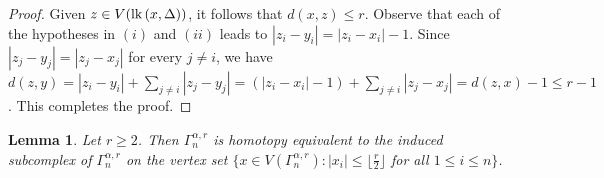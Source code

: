 \documentclass{amsart}
\newtheorem{lemma}[theorem]{Lemma}
\theoremstyle{definition}
\theoremstyle{remark}
\numberwithin{equation}{section}
\newcommand{\lk}{\mbox{\upshape lk}\,}
\newcommand{\D}{\Delta}
\newcommand{\f}{\lfloor\frac{r}{2}\rfloor}
\begin{document}
\begin{proof}
	Given $z\in V(\lk(x,\D))$, it follows that $d(x,z)\leq r$. Observe that each of the hypotheses in $(i)$ and $(ii)$ leads to $|z_i - y_i| = |z_i - x_i| - 1$. Since $|z_j - y_j| = |z_j - x_j|$ for every $j \neq i$, we have  $
	d(z, y) = |z_i - y_i| + \sum_{j \neq i} |z_j - y_j| = (|z_i - x_i| - 1) + \sum_{j \neq i} |z_j - x_j| = d(z, x) - 1 \leq r - 1$. This completes the proof.
\end{proof}


\begin{lemma}\label{r/2}
	Let $r\geq 2$. Then $\Gamma_{n}^{\alpha,r}$ is homotopy equivalent to the induced subcomplex of $\Gamma_{n}^{\alpha,r}$ on the vertex set 
	$\{x\in V(\Gamma_{n}^{\alpha,r}) : |x_i|\leq \f$ for all $1\leq i\leq n\}$.  
	
\end{lemma} 
\end{document}

